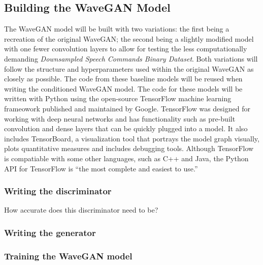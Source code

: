 \documentclass[a4paper, titlepage]{article}
\begin{document}
\subsection{Building the WaveGAN Model}

The WaveGAN model will be built with two variations: the first being a recreation of the original WaveGAN; the second being a slightly modified model with one fewer convolution layers to allow for testing the less computationally demanding \textit{Downsampled Speech Commands Binary Dataset}.
Both variations will follow the structure and hyperparameters used within the original WaveGAN as closely as possible.
The code from these baseline models will be reused when writing the conditioned WaveGAN model.
\newline
\newline
The code for these models will be written with Python using the open-source TensorFlow machine learning frameowork published and maintained by Google.
TensorFlow was designed for working with deep neural networks and has functionality such as pre-built convolution and dense layers that can be quickly plugged into a model.
It also includes TensorBoard, a visualization tool that portrays the model graph visually, plots quantitative measures and includes debugging tools.
Although TensorFlow is compatiable with some other languages, such as C++ and Java, the Python API for TensorFlow is ``the most complete and easiest to use.'' \cite{TensorFlowAPI}

\subsubsection{Writing the discriminator}

How accurate does this discriminator need to be?

\subsubsection{Writing the generator}

\subsubsection{Training the WaveGAN model}
\end{document}
